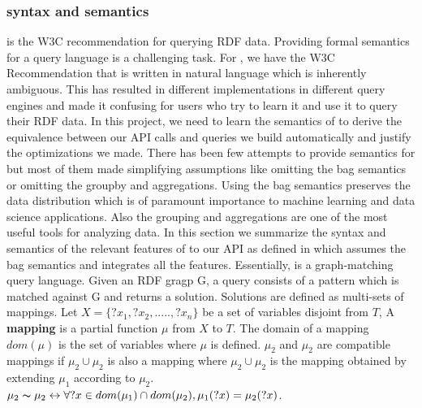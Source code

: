 \subsubsection{\sparql syntax and semantics}
\sparql is the W3C recommendation for querying RDF data.
Providing formal semantics for a query language is a challenging task. For \sparql, we have the W3C Recommendation that is written in natural language which is inherently ambiguous. This has resulted in different implementations in different query engines and made it confusing for users who try to learn it and use it to query their RDF data. In this project, we need to learn the semantics of \sparql to derive the equivalence between our API calls and \sparql queries we build automatically and justify the optimizations we made. There has been few attempts to provide semantics for \sparql but most of them made simplifying assumptions like omitting the bag semantics %
or omitting the groupby and aggregations. %
Using the bag semantics preserves the data distribution which is of paramount importance to machine learning and data science applications.\cite{sqlsemantics} Also the grouping and aggregations are one of the most useful tools for analyzing data. In this section we summarize the syntax and semantics of the relevant features of \sparql to our API as defined in \cite{kaminski2016semantics} which assumes the bag semantics and integrates all the  features. Essentially, \sparql is a graph-matching query language. Given an RDF gragp G, a query consists of a pattern which is matched against G and returns a solution. Solutions are defined as multi-sets of mappings. Let $X = \{?x_1, ?x_2, ....., ?x_n\}$ be a set of variables disjoint from $T$, A \textbf{mapping} is a partial function $\mu$ from $X$ to $T$. The domain of a mapping $dom(\mu)$ is the set of variables where $\mu$ is defined. $\mu_2$ and $\mu_2$ are compatible mappings if $\mu_2 \cup \mu_2$ is also a mapping where $\mu_2 \cup \mu_2$ is the mapping obtained by extending $\mu_1$ according to $\mu_2$. %
$\mu_2 \thicksim \mu_2 \leftrightarrow \forall ?x \in dom(\mu_1) \cap dom(\mu_2), \mu_1(?x) = \mu_2(?x)$.

